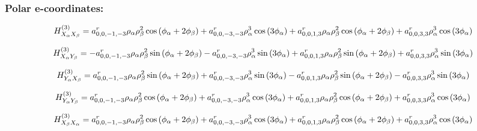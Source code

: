 \documentclass[fleqn]{article}
\begin{document}
\subsubsection*{Polar e-coordinates:}

\begin{dmath*}
H_{X_{\alpha}X_{\beta}}^{(3)}=a^{r}_{0,0,-1,-3} \rho_{\alpha} \rho_{\beta}^{2} \cos{\left (\phi_{\alpha} + 2 \phi_{\beta} \right )} + a^{r}_{0,0,-3,-3} \rho_{\alpha}^{3} \cos{\left (3 \phi_{\alpha} \right )} + a^{r}_{0,0,1,3} \rho_{\alpha} \rho_{\beta}^{2} \cos{\left (\phi_{\alpha} + 2 \phi_{\beta} \right )} + a^{r}_{0,0,3,3} \rho_{\alpha}^{3} \cos{\left (3 \phi_{\alpha} \right )}\\
\end{dmath*}

\begin{dmath*}
H_{X_{\alpha}Y_{\beta}}^{(3)}=-  a^{r}_{0,0,-1,-3} \rho_{\alpha} \rho_{\beta}^{2} \sin{\left (\phi_{\alpha} + 2 \phi_{\beta} \right )} -  a^{r}_{0,0,-3,-3} \rho_{\alpha}^{3} \sin{\left (3 \phi_{\alpha} \right )} +  a^{r}_{0,0,1,3} \rho_{\alpha} \rho_{\beta}^{2} \sin{\left (\phi_{\alpha} + 2 \phi_{\beta} \right )} +  a^{r}_{0,0,3,3} \rho_{\alpha}^{3} \sin{\left (3 \phi_{\alpha} \right )}\\
\end{dmath*}

\begin{dmath*}
H_{Y_{\alpha}X_{\beta}}^{(3)}= a^{r}_{0,0,-1,-3} \rho_{\alpha} \rho_{\beta}^{2} \sin{\left (\phi_{\alpha} + 2 \phi_{\beta} \right )} +  a^{r}_{0,0,-3,-3} \rho_{\alpha}^{3} \sin{\left (3 \phi_{\alpha} \right )} -  a^{r}_{0,0,1,3} \rho_{\alpha} \rho_{\beta}^{2} \sin{\left (\phi_{\alpha} + 2 \phi_{\beta} \right )} -  a^{r}_{0,0,3,3} \rho_{\alpha}^{3} \sin{\left (3 \phi_{\alpha} \right )}\\
\end{dmath*}

\begin{dmath*}
H_{Y_{\alpha}Y_{\beta}}^{(3)}= a^{r}_{0,0,-1,-3} \rho_{\alpha} \rho_{\beta}^{2} \cos{\left (\phi_{\alpha} + 2 \phi_{\beta} \right )} +  a^{r}_{0,0,-3,-3} \rho_{\alpha}^{3} \cos{\left (3 \phi_{\alpha} \right )} +  a^{r}_{0,0,1,3} \rho_{\alpha} \rho_{\beta}^{2} \cos{\left (\phi_{\alpha} + 2 \phi_{\beta} \right )} +  a^{r}_{0,0,3,3} \rho_{\alpha}^{3} \cos{\left (3 \phi_{\alpha} \right )}\\
\end{dmath*}

\begin{dmath*}
H_{X_{\beta}X_{\alpha}}^{(3)}=a^{r}_{0,0,-1,-3} \rho_{\alpha} \rho_{\beta}^{2} \cos{\left (\phi_{\alpha} + 2 \phi_{\beta} \right )} + a^{r}_{0,0,-3,-3} \rho_{\alpha}^{3} \cos{\left (3 \phi_{\alpha} \right )} + a^{r}_{0,0,1,3} \rho_{\alpha} \rho_{\beta}^{2} \cos{\left (\phi_{\alpha} + 2 \phi_{\beta} \right )} + a^{r}_{0,0,3,3} \rho_{\alpha}^{3} \cos{\left (3 \phi_{\alpha} \right )}\\
\end{dmath*}
\end{document}
